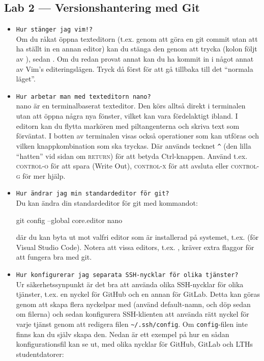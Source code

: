 \documentclass[fleqn, article, a4paper]{memoir}
\newcommand{\file}[1]{\texttt{#1}}
\newcommand{\commandchar}[1]{\textsc{#1}}
\begin{document}
\subsection{Lab 2 --- Versionshantering med Git}
\begin{itemize}
	\item \texttt{Hur stänger jag vim!?}\\
	      Om du råkat öppna texteditorn  (t.ex. genom att göra en git commit utan att ha ställt in en annan editor) kan du stänga den genom att trycka  (kolon följt av ), sedan . Om du redan provat annat kan du ha kommit in i något annat av Vim's editeringslägen. Tryck då först  för att gå tillbaka till det ``normala läget''.
	\item \texttt{Hur arbetar man med texteditorn nano?} \\
	      nano är en terminalbaserat texteditor. Den körs alltså direkt i terminalen utan att öppna några nya fönster, vilket kan vara fördelaktigt ibland. I editorn kan du flytta markören med piltangenterna och skriva text som förväntat. I botten av terminalen visas också operationer som kan utföras och vilken knappkombination som ska tryckas. Där används tecknet \texttt{\^{}} (den lilla ``hatten'' vid sidan om \commandchar{return}) för att betyda Ctrl-knappen. Använd t.ex. \commandchar{control-o} för att spara (Write Out), \commandchar{control-x} för att avsluta eller \commandchar{control-g} för mer hjälp.
	\item \texttt{Hur ändrar jag min standardeditor för git?}\\
	      Du kan ändra din standardeditor för git med kommandot:
	      \begin{Code}
		      git config --global core.editor nano
	      \end{Code}
	      där du kan byta ut  mot valfri editor som är installerad på systemet, t.ex.  (för Visual Studio Code). Notera att vissa editors, t.ex. , kräver extra flaggor för att fungera bra med git.
	\item \texttt{Hur konfigurerar jag separata SSH-nycklar för olika tjänster?}\\
	      Ur säkerhetssynpunkt är det bra att använda olika SSH-nycklar för olika tjänster, t.ex. en nyckel för GitHub och en annan för GitLab. Detta kan göras genom att skapa flera nyckelpar med  (använd default-namn, och döp sedan om filerna) och sedan konfigurera SSH-klienten att använda rätt nyckel för varje tjänst genom att redigera filen \file{\textasciitilde/.ssh/config}. Om \file{config}-filen inte finns kan du själv skapa den. Nedan är ett exempel på hur en sådan konfigurationsfil kan se ut, med olika nycklar för GitHub, GitLab och LTHs studentdatorer:

\end{itemize}
\end{document}
